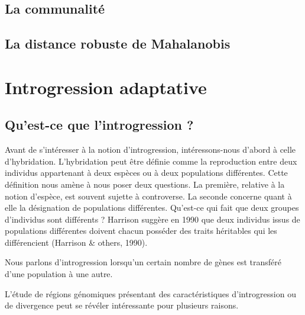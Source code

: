 \documentclass[12pt,twoside]{reedthesis}
\begin{document}
  \section{La communalité}\label{la-communalite}
  
  \newpage
  
  
  
  \newpage
  
  \section{La distance robuste de
  Mahalanobis}\label{la-distance-robuste-de-mahalanobis}
  
  \newpage
  
  
  
  \newpage
  
  \chapter{Introgression adaptative}\label{introgression-adaptative}
  
  \section{Qu'est-ce que l'introgression
  ?}\label{quest-ce-que-lintrogression}
  
  Avant de s'intéresser à la notion d'introgression, intéressons-nous
  d'abord à celle d'hybridation. L'hybridation peut être définie comme la
  reproduction entre deux individus appartenant à deux espèces ou à deux
  populations différentes. Cette définition nous amène à nous poser deux
  questions. La première, relative à la notion d'espèce, est souvent
  sujette à controverse. La seconde concerne quant à elle la désignation
  de populations différentes. Qu'est-ce qui fait que deux groupes
  d'individus sont différents ? Harrison suggère en 1990 que deux
  individus issus de populations différentes doivent chacun posséder des
  traits héritables qui les différencient (Harrison \& others, 1990).
  
  Nous parlons d'introgression lorsqu'un certain nombre de gènes est
  transféré d'une population à une autre.
  
  L'étude de régions génomiques présentant des caractéristiques
  d'introgression ou de divergence peut se révéler intéressante pour
  plusieurs raisons.
  
\end{document}
